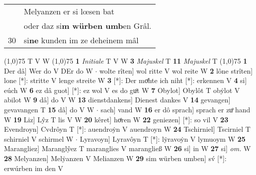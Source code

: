 \documentclass[8pt,a4paper,notitlepage]{article}
\begin{document}
\begin{table}[ht]
\begin{minipage}[t]{0.5\linewidth}
\begin{tabular}{rl}
 & Melyanzen er si lœsen bat\\ 
 & oder daz si\textbf{m würben umb}en Grâl.\\ 
30 & si\textbf{ne} kunden im ze deheinem mâl\\ 
\end{tabular}
\scriptsize
\line(1,0){75} \newline
T V W \newline
\line(1,0){75} \newline
\textbf{1} \textit{Initiale} T V W  \textbf{3} \textit{Majuskel} T  \textbf{11} \textit{Majuskel} T  \newline
\line(1,0){75} \newline
\textbf{1} Der dâ] Wer do V DEr do W  $\cdot$ wolte rîten] wol ritte V wol reite W \textbf{2} lône strîten] lone [*]: stritte V lenge streite W \textbf{3} [*]: Der moͤhte ich niht [*]: erkennen V \textbf{4} si] eúch W \textbf{6} ez dâ guot] [*]: ez wol V es do guͦt W \textbf{7} Obylot] Obylôt T obẏlot V abilot W \textbf{9} dâ] do V W \textbf{13} dienstdankens] Dienest dankes V \textbf{14} gevangen] gevavangen T \textbf{15} dâ] do V W  $\cdot$ sach] vand W \textbf{16} er dô sprach] sprach er zuͦ hand W \textbf{19} Liz] Lŷz T lis V W \textbf{20} kêret] hoͤren W \textbf{22} geniezen] [*]: so vil V \textbf{23} Evendroyn] Cvdrôyn T [*]: auendroẏn V auendroyn W \textbf{24} Tschirniel] Tscirniel T schirniel V schirmel W  $\cdot$ Lyravoyn] Lyravôyn T [*]: lẏravoẏn V lymuoym W \textbf{25} Marangliez] Maranglŷez T maranglies V marangließ W \textbf{26} si] in W \textbf{27} si] \textit{om.} W \textbf{28} Melyanzen] Melẏanzen V Melianzen W \textbf{29} sim würben umben] sv́ [*]: erwúrben im den V \newline
\end{minipage}
\end{table}
\end{document}
